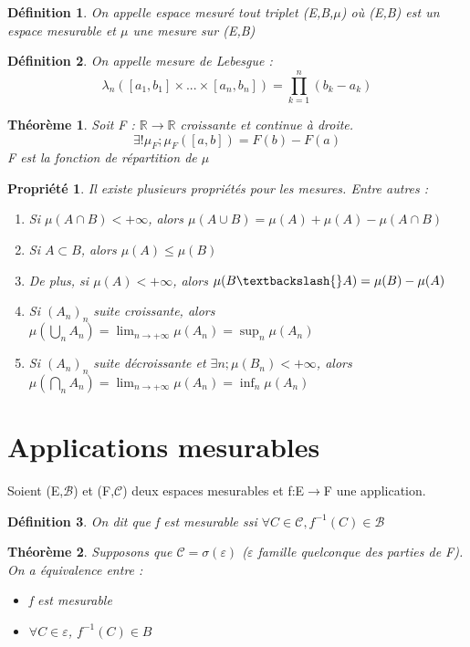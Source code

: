 \documentclass{article}
\theoremstyle{mes_theoremes}
\newtheorem{theo}{Théorème}[section]
\newtheorem*{Def}{Définition}
\newtheorem{prop}{Propriété}[section]
\begin{document}
\begin{Def}
On appelle espace mesuré tout triplet (E,B,$\mu$) où (E,B) est un espace mesurable et $\mu$ une mesure sur (E,B)
\end{Def}

\begin{Def}
On appelle mesure de Lebesgue : \[\lambda_n \left([a_1,b_1] \times ... \times [a_n,b_n]\right) = \prod_{k=1}^n \left(b_k - a_k\right)\]
\end{Def}

\begin{theo}
Soit F : $\mathbb{R} \rightarrow \mathbb{R}$ croissante et continue à droite. \[\exists! \mu_F; \mu_F([a,b])=F(b)-F(a)\]
F est la fonction de répartition de $\mu$
\end{theo}

\begin{prop}
Il existe plusieurs propriétés pour les mesures. Entre autres :
\begin{enumerate}
\item Si $\mu(A\cap B)<+\infty$, alors $\mu(A\cup B)=\mu(A) + \mu(A) - \mu(A\cap B)$
\item Si $A\subset B$, alors $\mu(A) \leq \mu(B)$
\item De plus, si $\mu(A) < +\infty$, alors $\mu(B\textbackslash{}A)=\mu(B) - \mu(A)$
\item Si $(A_n)_n$ suite croissante, alors $\mu(\bigcup_n A_n) = \lim_{n\rightarrow +\infty} \mu(A_n) = \sup_n \mu(A_n)$
\item Si $(A_n)_n$ suite décroissante et $\exists n; \mu(B_n)<+\infty$, alors $\mu(\bigcap_n A_n) = \lim_{n\rightarrow +\infty} \mu(A_n) = \inf_n \mu(A_n)$
\end{enumerate}
\end{prop}

\newpage

\section{Applications mesurables}
Soient (E,$\mathcal{B}$) et (F,$\mathcal{C}$) deux espaces mesurables et f:E$\rightarrow$F une application.

\begin{Def}
On dit que f est mesurable ssi $\forall C\in \mathcal{C}, f^{-1}(C)\in \mathcal{B}$
\end{Def}

\begin{theo}
Supposons que $\mathcal{C} = \sigma(\varepsilon)$ ($\varepsilon$ famille quelconque des parties de F). On a équivalence entre :
\begin{itemize}
\item f est mesurable
\item $\forall C\in \varepsilon$, $f^{-1}(C)\in B$
\end{itemize}
\end{theo}
\end{document}

